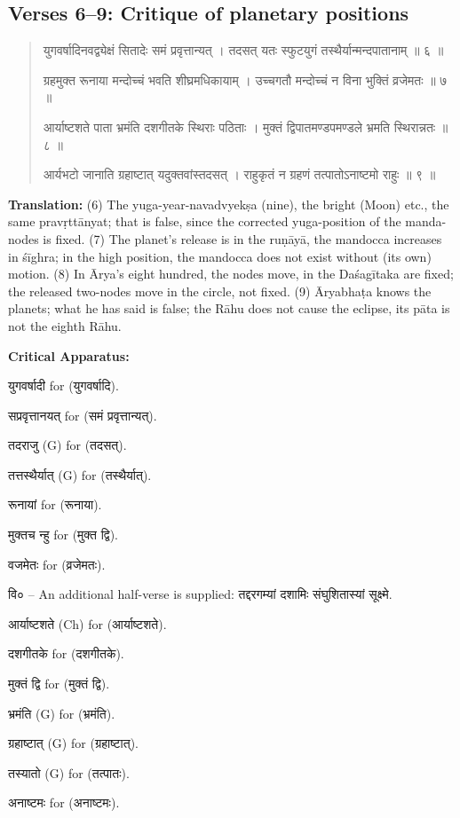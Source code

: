\documentclass[11pt,a4paper]{article}
\newcommand{\dev}[1]{{\devanagarifont #1}}
\newenvironment{sanskritverse}{%
  \begin{quote}%
  \devanagarifont%
  \setlength{\leftmargin}{2em}%
}{\end{quote}}
\newenvironment{variants}{%
  \small%
  \color{varecolor}%
  \list{}{\leftmargin=2em\itemindent=-1em}%
}{\endlist}
\begin{document}
\subsection*{Verses 6--9: Critique of planetary positions}

\begin{sanskritverse}
\dev{युगवर्षादिनवद्व्येक्षं सितादेः समं प्रवृत्तान्यत्} ।
\dev{तदसत् यतः स्फुटयुगं तस्थैर्यान्मन्दपातानाम् ॥ ६ ॥}

\dev{ग्रहमुक्त रूनाया मन्दोच्चं भवति शीघ्रमधिकायाम्} ।
\dev{उच्चगतौ मन्दोच्चं न विना भुक्तिं व्रजेमतः ॥ ७ ॥}

\dev{आर्याष्टशते पाता भ्रमंति दशगीतके स्थिराः पठिताः} ।
\dev{मुक्तं द्विपातमण्डपमण्डले भ्रमति स्थिरान्नतः ॥ ८ ॥}

\dev{आर्यभटो जानाति ग्रहाष्टात् यदुक्तवांस्तदसत्} ।
\dev{राहुकृतं न ग्रहणं तत्पातोऽनाष्टमो राहुः ॥ ९ ॥}
\end{sanskritverse}

\textbf{Translation:} (6) The yuga-year-navadvyekṣa (nine), the bright (Moon) etc., 
the same pravṛttānyat; that is false, since the corrected yuga-position of the 
manda-nodes is fixed. (7) The planet's release is in the ruṇāyā, the mandocca 
increases in śīghra; in the high position, the mandocca does not exist without 
(its own) motion. (8) In Ārya's eight hundred, the nodes move, in the Daśagītaka 
are fixed; the released two-nodes move in the circle, not fixed. (9) Āryabhaṭa 
knows the planets; what he has said is false; the Rāhu does not cause the eclipse, 
its pāta is not the eighth Rāhu.

\textcolor{varecolor}{\textbf{Critical Apparatus:}}
\begin{variants}
\item[6.1] \dev{युगवर्षादी} \dev{for} (\dev{युगवर्षादि}).
\item[6.2] \dev{सप्रवृत्तानयत्} \dev{for} (\dev{समं प्रवृत्तान्यत्}).
\item[6.3] \dev{तदराजु} (G) \dev{for} (\dev{तदसत्}).
\item[6.4] \dev{तत्तस्थैर्यात्} (G) \dev{for} (\dev{तस्थैर्यात्}).
\item[7.1] \dev{रूनायां} \dev{for} (\dev{रूनाया}).
\item[7.2] \dev{मुक्तच न्हु} \dev{for} (\dev{मुक्त द्वि}).
\item[7.3] \dev{वजमेतः} \dev{for} (\dev{व्रजेमतः}).
\item[7.4] \dev{वि०} -- An additional half-verse is supplied: 
\dev{तद्दरगम्यां दशामिः संघुशितास्यां सूक्ष्मे}.
\item[8.1] \dev{आर्याष्टशते} (Ch) \dev{for} (\dev{आर्याष्टशते}).
\item[8.2] \dev{दशगीतके} \dev{for} (\dev{दशगीतके}).
\item[8.3] \dev{मुक्तं द्वि} \dev{for} (\dev{मुक्तं द्वि}).
\item[8.4] \dev{भ्रमंति} (G) \dev{for} (\dev{भ्रमंति}).
\item[9.1] \dev{ग्रहाष्टात्} (G) \dev{for} (\dev{ग्रहाष्टात्}).
\item[9.2] \dev{तस्यातो} (G) \dev{for} (\dev{तत्पातः}).
\item[9.3] \dev{अनाष्टमः} \dev{for} (\dev{अनाष्टमः}).
\end{variants}
\end{document}
